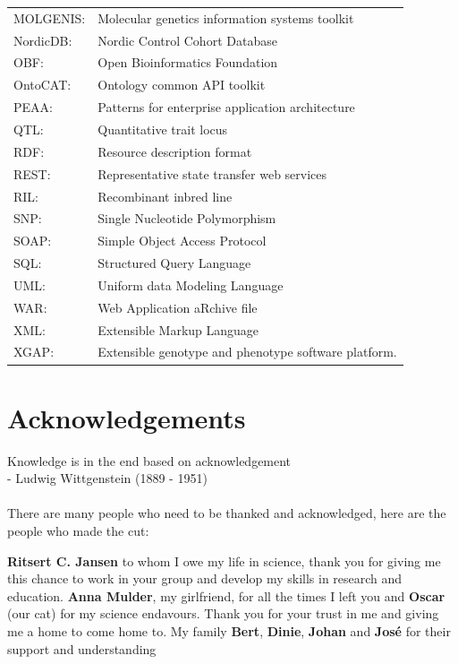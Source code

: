 {\begin{tabular}{ l l }
MOLGENIS:    & Molecular genetics information systems toolkit\\
NordicDB:    & Nordic Control Cohort Database\\
OBF:         & Open Bioinformatics Foundation\\
OntoCAT:     & Ontology common API toolkit\\
PEAA:        & Patterns for enterprise application architecture\\
QTL:         & Quantitative trait locus\\
RDF:         & Resource description format\\
REST:        & Representative state transfer web services\\
RIL:         & Recombinant inbred line \\
SNP:         & Single Nucleotide Polymorphism\\
SOAP:        & Simple Object Access Protocol\\
SQL:         & Structured Query Language\\
UML:         & Uniform data Modeling Language\\
WAR:         & Web Application aRchive file\\
XML:         & Extensible Markup Language\\
XGAP:        & Extensible genotype and phenotype software platform. 
\end{tabular}
}
\newpage

\section*{Acknowledgements}
Knowledge is in the end based on acknowledgement\\
- Ludwig Wittgenstein (1889 - 1951)\\\\

There are many people who need to be thanked and acknowledged, 
here are the people who made the cut:

{\bf Ritsert C. Jansen} to whom I owe my life in science, thank you for giving me this chance 
to work in your group and develop my skills in research and education. {\bf Anna Mulder}, my 
girlfriend, for all the times I left you and {\bf Oscar} (our cat) for my science endavours. 
Thank you for your trust in me and giving me a home to come home to. My family {\bf Bert}, 
{\bf Dinie}, {\bf Johan} and {\bf Jos\'{e}} for their support and understanding

